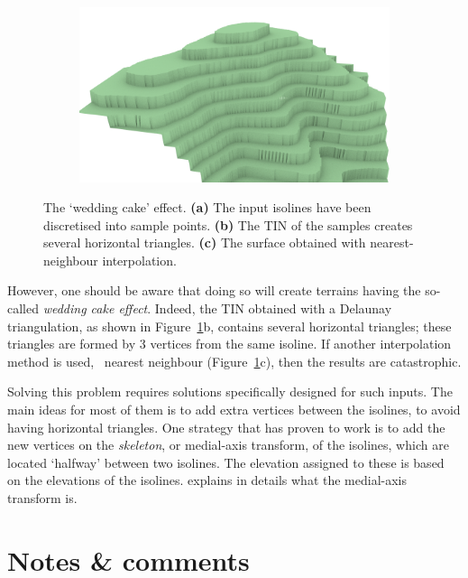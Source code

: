 \begin{figure}
\begin{subfigure}[b]{0.38\linewidth}
    \caption{}
  \end{subfigure}
  \begin{subfigure}[b]{0.38\linewidth}
    \centering
    \includegraphics[width=\textwidth]{figs/wedding-nn.png}
    \caption{}
  \end{subfigure}  
\caption{The `wedding cake' effect. \textbf{(a)} The input isolines have been discretised into sample points. \textbf{(b)} The TIN of the samples creates several horizontal triangles. \textbf{(c)} The surface obtained with nearest-neighbour interpolation.}%
\label{fig:wedding}
\end{figure}
However, one should be aware that doing so will create terrains having the so-called \emph{wedding cake effect}.
Indeed, the TIN obtained with a Delaunay triangulation, as shown in Figure~\ref{fig:wedding}b, contains several horizontal triangles; these triangles are formed by 3 vertices from the same isoline.
If another interpolation method is used, \eg\ nearest neighbour (Figure~\ref{fig:wedding}c), then the results are catastrophic.

%

Solving this problem requires solutions specifically designed for such inputs.
The main ideas for most of them is to add extra vertices between the isolines, to avoid having horizontal triangles. 
One strategy that has proven to work is to add the new vertices on the \emph{skeleton}, or medial-axis transform, of the isolines, which are located `halfway' between two isolines.
The elevation assigned to these is based on the elevations of the isolines.
 explains in details what the medial-axis transform is.


%
\section{Notes \& comments}

